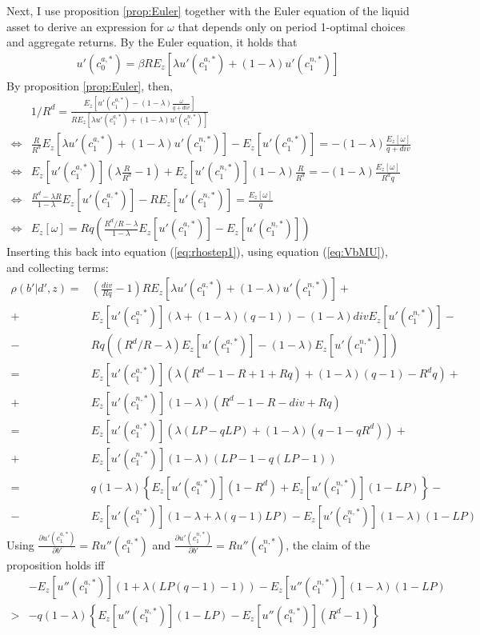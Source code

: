 \documentclass[11pt]{article} %
\begin{document}
Next, I use proposition \ref{prop:Euler} together with the Euler equation of the liquid asset to derive an expression for $\omega$ that depends only on period 1-optimal choices and aggregate returns. By the Euler equation, it holds that
\begin{align}
u'(c^{a,*}_0) = \beta R E_z [\lambda u'(c^{a,*}_1)+(1-\lambda) u'(c^{n,*}_1)]
\end{align}
By proposition \ref{prop:Euler}, then,
\begin{align}
&1/R^d = \frac{E_z\left[ u'(c^{a,*}_1)-(1-\lambda)\frac{\omega}{q+div}\right] }{RE_z[\lambda u'(c^{a,*}_1)+(1-\lambda)u'(c^{n,*}_1)]}\\
\Leftrightarrow& \frac{R}{R^d}E_z[\lambda u'(c^{a,*}_1)+(1-\lambda) u'(c^{n,*}_1)] - E_z[u'(c_1^{a,*})] = -(1-\lambda)\frac{E_z[\omega]}{q+div}\\
\Leftrightarrow & E_z[u'(c^{a,*}_1)] \left( \lambda \frac{R}{R^d} - 1\right) + E_z[u'(c^{n,*}_1)] (1-\lambda) \frac{R}{R^d} = -(1-\lambda) \frac{E_z[\omega]}{R^d q}\\
\Leftrightarrow &\frac{R^d - \lambda R}{1-\lambda} E_z[u'(c^{a,*}_1)] - R E_z[u'(c^{n,*}_1)]  = \frac{E_z[\omega]}{q}\\
\Leftrightarrow & E_z[\omega] = Rq \left( \frac{R^d/R-\lambda}{1-\lambda} E_z[u'(c^{a,*}_1)]-E_z[u'(c^{n,*}_1)] \right)
\end{align}
Inserting this back into equation (\ref{eq:rhostep1}), using equation (\ref{eq:VbMU}), and collecting terms:
\begin{align}
\rho(b'|d',z)=&\left(\frac{div}{Rq}-1\right) R E_z[\lambda u'(c^{a,*}_1)+(1-\lambda)u'(c^{n,*}_1)] +\nonumber \\
+&  E_z[u'(c^{a,*}_1)](\lambda + (1-\lambda)(q-1)) - (1-\lambda)div E_z[u'(c^{n,*}_1)] -\nonumber \\- &  Rq ( (R^d/R-\lambda) E_z[u'(c^{a,*}_1)] - (1-\lambda) E_z[u'(c^{n,*}_1)])\\
= & E_z[u'(c^{a,*}_1)]\left(\lambda (R^d-1-R+1+Rq)+(1-\lambda)(q-1)-R^dq\right) + \nonumber \\
+& E_z[u'(c^{n,*}_1)](1-\lambda)(R^d-1-R-div+Rq)\\
= & E_z[u'(c^{a,*}_1)] \left( \lambda(LP - qLP) + (1-\lambda)(q-1-qR^d) \right)+\nonumber \\+ &E_z[u'(c^{n,*}_1)](1-\lambda)\left(LP - 1 - q(LP - 1)\right)\\
=& q(1-\lambda) \left\{ E_z[u'(c^{a,*}_1)] (1-R^d) + E_z[u'(c^{n,*}_1)] (1-LP) \right\}- \nonumber \\
-& E_z[u'(c^{a,*}_1)]( 1-\lambda+\lambda(q-1)LP)-E_z[u'(c^{n,*}_1)](1-\lambda)(1-LP)
\end{align}
Using $\frac{\partial u'(c^{a,*}_1)}{\partial b'} = R u''(c^{a,*}_1)$ and $\frac{\partial u'(c^{n,*}_1)}{\partial b'} = R u''(c^{n,*}_1)$, the claim of the proposition holds iff
\begin{align}
&-E_z[u''(c^{a,*}_1)](1+\lambda(LP(q-1)-1)) - E_z[u''(c^{n,*}_1)](1-\lambda)(1-LP)\nonumber \\> &-q(1-\lambda) \left\{  E_z[u''(c^{n,*}_1)] (1-LP) -E_z[u''(c^{a,*}_1)] (R^d-1) \right\}\label{ineq:toshow}
\end{align}
\end{document}
